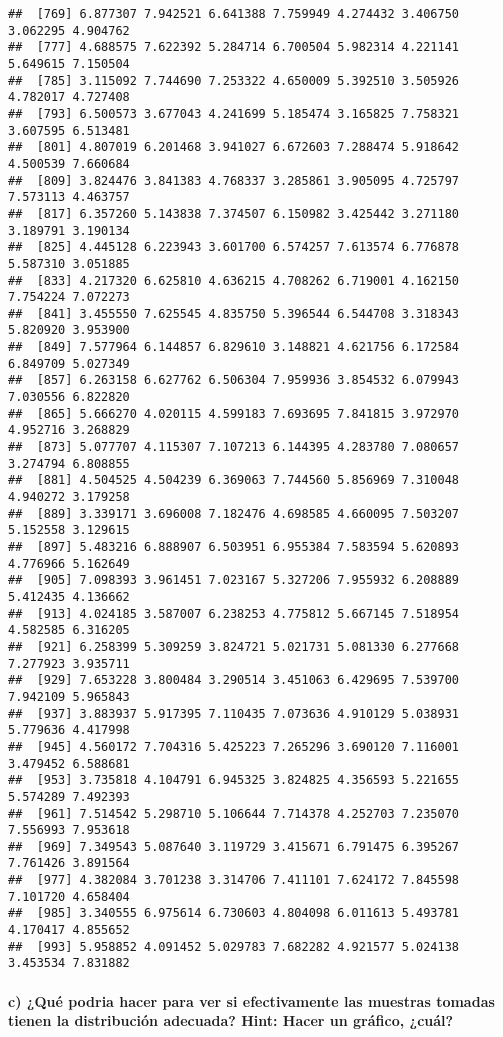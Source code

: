 \documentclass[
]{article}
\begin{document}
\begin{verbatim}
##  [769] 6.877307 7.942521 6.641388 7.759949 4.274432 3.406750 3.062295 4.904762
##  [777] 4.688575 7.622392 5.284714 6.700504 5.982314 4.221141 5.649615 7.150504
##  [785] 3.115092 7.744690 7.253322 4.650009 5.392510 3.505926 4.782017 4.727408
##  [793] 6.500573 3.677043 4.241699 5.185474 3.165825 7.758321 3.607595 6.513481
##  [801] 4.807019 6.201468 3.941027 6.672603 7.288474 5.918642 4.500539 7.660684
##  [809] 3.824476 3.841383 4.768337 3.285861 3.905095 4.725797 7.573113 4.463757
##  [817] 6.357260 5.143838 7.374507 6.150982 3.425442 3.271180 3.189791 3.190134
##  [825] 4.445128 6.223943 3.601700 6.574257 7.613574 6.776878 5.587310 3.051885
##  [833] 4.217320 6.625810 4.636215 4.708262 6.719001 4.162150 7.754224 7.072273
##  [841] 3.455550 7.625545 4.835750 5.396544 6.544708 3.318343 5.820920 3.953900
##  [849] 7.577964 6.144857 6.829610 3.148821 4.621756 6.172584 6.849709 5.027349
##  [857] 6.263158 6.627762 6.506304 7.959936 3.854532 6.079943 7.030556 6.822820
##  [865] 5.666270 4.020115 4.599183 7.693695 7.841815 3.972970 4.952716 3.268829
##  [873] 5.077707 4.115307 7.107213 6.144395 4.283780 7.080657 3.274794 6.808855
##  [881] 4.504525 4.504239 6.369063 7.744560 5.856969 7.310048 4.940272 3.179258
##  [889] 3.339171 3.696008 7.182476 4.698585 4.660095 7.503207 5.152558 3.129615
##  [897] 5.483216 6.888907 6.503951 6.955384 7.583594 5.620893 4.776966 5.162649
##  [905] 7.098393 3.961451 7.023167 5.327206 7.955932 6.208889 5.412435 4.136662
##  [913] 4.024185 3.587007 6.238253 4.775812 5.667145 7.518954 4.582585 6.316205
##  [921] 6.258399 5.309259 3.824721 5.021731 5.081330 6.277668 7.277923 3.935711
##  [929] 7.653228 3.800484 3.290514 3.451063 6.429695 7.539700 7.942109 5.965843
##  [937] 3.883937 5.917395 7.110435 7.073636 4.910129 5.038931 5.779636 4.417998
##  [945] 4.560172 7.704316 5.425223 7.265296 3.690120 7.116001 3.479452 6.588681
##  [953] 3.735818 4.104791 6.945325 3.824825 4.356593 5.221655 5.574289 7.492393
##  [961] 7.514542 5.298710 5.106644 7.714378 4.252703 7.235070 7.556993 7.953618
##  [969] 7.349543 5.087640 3.119729 3.415671 6.791475 6.395267 7.761426 3.891564
##  [977] 4.382084 3.701238 3.314706 7.411101 7.624172 7.845598 7.101720 4.658404
##  [985] 3.340555 6.975614 6.730603 4.804098 6.011613 5.493781 4.170417 4.855652
##  [993] 5.958852 4.091452 5.029783 7.682282 4.921577 5.024138 3.453534 7.831882
\end{verbatim}

\hypertarget{c-quuxe9-podria-hacer-para-ver-si-efectivamente-las-muestras-tomadas-tienen-la-distribuciuxf3n-adecuada-hint-hacer-un-gruxe1fico-cuuxe1l}{%
\paragraph{c) ¿Qué podria hacer para ver si efectivamente las muestras
tomadas tienen la distribución adecuada? Hint: Hacer un gráfico,
¿cuál?}\label{c-quuxe9-podria-hacer-para-ver-si-efectivamente-las-muestras-tomadas-tienen-la-distribuciuxf3n-adecuada-hint-hacer-un-gruxe1fico-cuuxe1l}}
\end{document}
